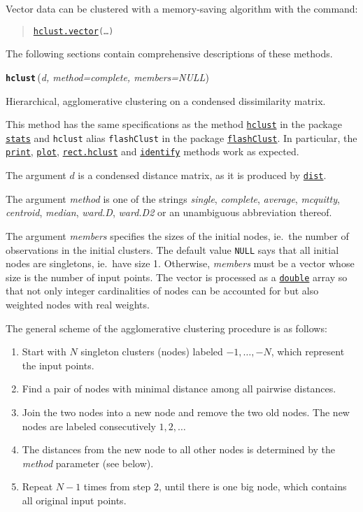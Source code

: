 \documentclass[fontsize=10pt,paper=letter,BCOR=-6mm,DIV=8]{scrartcl}
\makeatletter
\newcommand*\q{\textquotesingle}
\newcommand*\hclust{\href{https://stat.ethz.ch/R-manual/R-patched/library/stats/html/hclust.html}{\texttt{hclust}}}
\newcommand*\stats{\href{https://stat.ethz.ch/R-manual/R-patched/library/stats/html/00Index.html}{\texttt{stats}}}
\newcommand*\flashClustPack{\href{https://CRAN.R-project.org/package=flashClust}{\texttt{flashClust}}}
\newcommand*\dist{\href{https://stat.ethz.ch/R-manual/R-patched/library/stats/html/dist.html}{\texttt{dist}}}
\newcommand*\print{\href{https://stat.ethz.ch/R-manual/R-patched/library/base/html/print.html}{\texttt{print}}}
\newcommand*\plot{\href{https://stat.ethz.ch/R-manual/R-patched/library/graphics/html/plot.html}{\texttt{plot}}}
\newcommand*\identify{\href{https://stat.ethz.ch/R-manual/R-patched/library/stats/html/identify.hclust.html}{\texttt{identify}}}
\newcommand*\rect{\href{https://stat.ethz.ch/R-manual/R-patched/library/stats/html/rect.hclust.html}{\texttt{rect.hclust}}}
\newcommand*\double{\href{https://stat.ethz.ch/R-manual/R-patched/library/base/html/double.html}{\texttt{double}}}
\newenvironment{methods}{%
  \list{}{\labelwidth\z@
    \itemindent-\leftmargin
    \let\makelabel\methodslabel}%
}{%
  \endlist
}
\newcommand*{\methodslabel}[1]{%
  \hbox to \textwidth{\hspace{\labelsep}%
  \normalfont\bfseries\ttfamily
  #1\hskip-\labelsep\hfill}%
}
\makeatother
\begin{document}
Vector data can be clustered with a memory-saving algorithm with the command:
\begin{quote}
    \texttt{\hyperref[hclust.vector]{hclust.vector}(…)}
 \end{quote}

The following sections contain comprehensive descriptions of these methods.

\begin{methods}
\item [\normalfont\texttt{\textbf{hclust}}\,(\textit{d, method=\q complete\q, members=NULL})]
\label{hclust}

Hierarchical, agglomerative clustering on a condensed dissimilarity matrix.

This method has the same specifications as the method \hclust{} in the package \stats{} and \texttt{hclust} alias \texttt{flashClust} in the package \flashClustPack{}. In particular, the \print{}, \plot{}, \rect{} and \identify{} methods work as expected.

The argument $d$ is a condensed distance matrix, as it is produced by \dist.

The argument \textit{method} is one of the strings \textit{\q single\q}, \textit{\q complete\q}, \textit{\q average\q}, \textit{\q mcquitty\q}, \textit{\q centroid\q}, \textit{\q median\q}, \textit{\q ward.D\q}, \textit{\q ward.D2\q} or an unambiguous abbreviation thereof.

The argument \textit{members} specifies the sizes of the initial nodes, ie.\ the number of observations in the initial clusters. The default value \texttt{NULL} says that all initial nodes are singletons, ie.\ have size 1. Otherwise, \textit{members} must be a vector whose size is the number of input points. The vector is processed as a \double{} array so that not only integer cardinalities of nodes can be accounted for but also weighted nodes with real weights.

The general scheme of the agglomerative clustering procedure is as follows:
\begin{enumerate}
\item Start with $N$ singleton clusters (nodes) labeled $-1,\ldots, -N$, which represent the input points.
\item Find a pair of nodes with minimal distance among all pairwise distances.
\item Join the two nodes into a new node and remove the two old nodes. The new nodes are labeled consecutively $1,2,\ldots$
\item The distances from the new node to all other nodes is determined by the \textit{method} parameter (see below).
\item Repeat $N-1$ times from step 2, until there is one big node, which contains all original input points.
\end{enumerate}


\end{methods}
\end{document}
